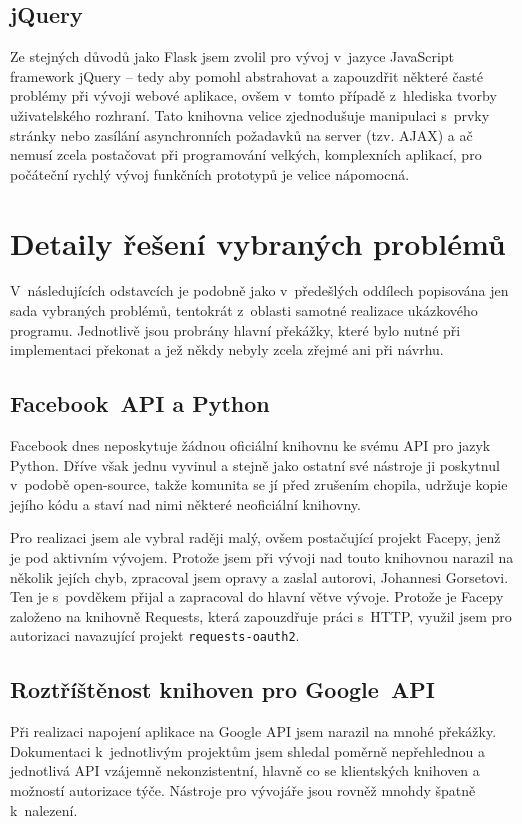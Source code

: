 \documentclass[12pt,oneside,final]{fithesis2}
\begin{document}
\subsection{jQuery}
Ze stejných důvodů jako Flask jsem zvolil pro vývoj v~jazyce JavaScript framework jQuery -- tedy aby pomohl abstrahovat a zapouzdřit některé časté problémy při vývoji webové aplikace, ovšem v~tomto případě z~hlediska tvorby uživatelského rozhraní. Tato knihovna velice zjednodušuje manipulaci s~prvky stránky nebo zasílání asynchronních požadavků na server (tzv. AJAX) a ač nemusí zcela postačovat při programování velkých, komplexních aplikací, pro počáteční rychlý vývoj funkčních prototypů je velice nápomocná.


\section{Detaily řešení vybraných problémů}
V~následujících odstavcích je podobně jako v~předešlých oddílech popisována jen sada vybraných problémů, tentokrát z~oblasti samotné realizace ukázkového programu. Jednotlivě jsou probrány hlavní překážky, které bylo nutné při implementaci překonat a jež někdy nebyly zcela zřejmé ani při návrhu.

\subsection{Facebook~API a Python}
Facebook dnes neposkytuje žádnou oficiální knihovnu ke svému API pro jazyk Python. Dříve však jednu vyvinul a stejně jako ostatní své nástroje ji poskytnul v~podobě open-source, takže komunita se jí před zrušením chopila, udržuje kopie jejího kódu a staví nad nimi některé neoficiální knihovny.

Pro realizaci jsem ale vybral raději malý, ovšem postačující projekt Facepy, jenž je pod aktivním vývojem. Protože jsem při vývoji nad touto knihovnou narazil na několik jejích chyb, zpracoval jsem opravy a zaslal autorovi, Johannesi Gorsetovi. Ten je s~povděkem přijal a zapracoval do hlavní větve vývoje. Protože je Facepy založeno na knihovně Requests, která zapouzdřuje práci s~HTTP, využil jsem pro autorizaci navazující projekt {\tt requests-oauth2}.

\subsection{Roztříštěnost knihoven pro Google~API}
Při realizaci napojení aplikace na Google API jsem narazil na mnohé překážky. Dokumentaci k~jednotlivým projektům jsem shledal poměrně nepřehlednou a jednotlivá API vzájemně nekonzistentní, hlavně co se klientských knihoven a možností autorizace týče. Nástroje pro vývojáře jsou rovněž mnohdy špatně k~nalezení.
\end{document}
